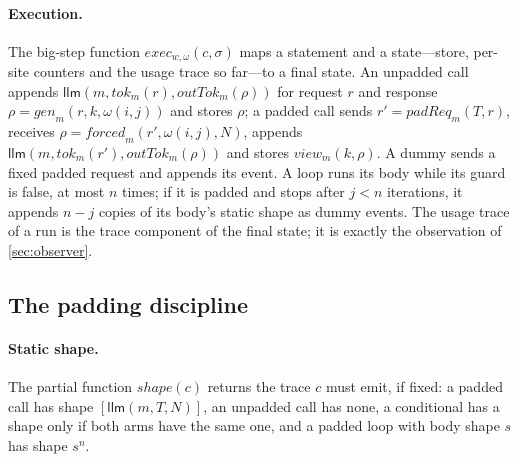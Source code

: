 \paragraph{Execution.} The big-step function $\mathit{exec}_{w,\omega}(c, \sigma)$ maps a statement and a state---store, per-site counters and the usage trace so far---to a final state. An unpadded call appends $\mathsf{llm}(m, \mathit{tok}_m(r), \mathit{outTok}_m(\rho))$ for request $r$ and response $\rho = \mathit{gen}_m(r, k, \omega(i, j))$ and stores $\rho$; a padded call sends $r' = \mathit{padReq}_m(T, r)$, receives $\rho = \mathit{forced}_m(r', \omega(i,j), N)$, appends $\mathsf{llm}(m, \mathit{tok}_m(r'), \mathit{outTok}_m(\rho))$ and stores $\mathit{view}_m(k, \rho)$. A dummy sends a fixed padded request and appends its event. A loop runs its body while its guard is false, at most $n$ times; if it is padded and stops after $j<n$ iterations, it appends $n-j$ copies of its body's static shape as dummy events. The usage trace of a run is the trace component of the final state; it is exactly the observation of \cref{sec:observer}.

\subsection{The padding discipline}\label{sec:discipline}

\paragraph{Static shape.} The partial function $\mathit{shape}(c)$ returns the trace $c$ must emit, if fixed: a padded call has shape $[\mathsf{llm}(m,T,N)]$, an unpadded call has none, a conditional has a shape only if both arms have the same one, and a padded loop with body shape $s$ has shape $s^n$.

